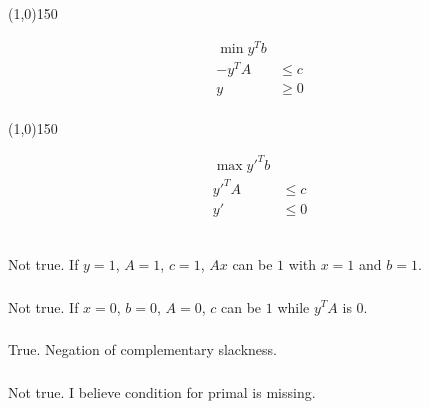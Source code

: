 \documentclass[a4paper,11pt,oneside,onecolumn]{article}
\def\zline{
    \vspace{-3.9em}
    \begin{center}\centering\line(1,0){150}\end{center}
    \vspace{-2.9em}
}
\begin{document}
\zline

\begin{align*}
\min y^Tb & \\
-y^TA & \le c \\
y & \ge 0 \\
\end{align*}

\zline

\begin{align*}
\max y'^Tb & \\
y'^TA & \le c \\
y' & \le 0 \\
\end{align*}

\subsection{}

\subsubsection{}

Not true. If $y = 1$, $A = 1$, $c = 1$, $Ax$ can be $1$ with $x = 1$ and $b = 1$.

\subsubsection{}

Not true. If $x = 0$, $b = 0$, $A = 0$, $c$ can be $1$ while $y^TA$ is $0$.

\subsubsection{}

True. Negation of complementary slackness.

\subsubsection{}

Not true. I believe condition for primal is missing.

\section{}

\section{}

\section{}

\section{}
\end{document}
